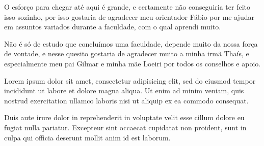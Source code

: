 \begin{agradecimentos}

O esforço para chegar até aqui é grande, e certamente não conseguiria ter feito isso sozinho, por isso gostaria de agradecer meu orientador Fábio por me ajudar em assuntos variados durante a faculdade, com o qual aprendi muito. 

Não é só de estudo que concluímos uma faculdade, depende muito da nossa força de vontade, e nesse quesito gostaria de agradecer muito a minha irmã Thaís, e especialmente meu pai Gilmar e minha mãe Loeiri por todos os conselhos e apoio. 

Lorem ipsum dolor sit amet, consectetur adipisicing elit, sed do eiusmod
tempor incididunt ut labore et dolore magna aliqua. Ut enim ad minim veniam,
quis nostrud exercitation ullamco laboris nisi ut aliquip ex ea commodo
consequat. 

Duis aute irure dolor in reprehenderit in voluptate velit esse
cillum dolore eu fugiat nulla pariatur. Excepteur sint occaecat cupidatat non
proident, sunt in culpa qui officia deserunt mollit anim id est laborum.

\end{agradecimentos}